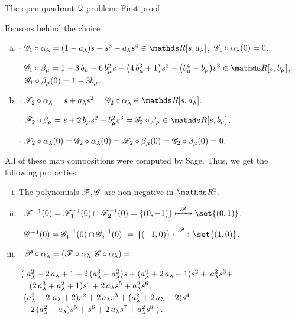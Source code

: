 \documentclass[11pt, a4paper, english, twoside, notitlepage, openright]{report}
\begin{document}
\begin{chapter}{The open quadrant $\mathcal{Q}$ problem: First proof}
\begin{section}{Reasons behind the choice}
\begin{enumerate}[(a)]
\item $\cdot$ $ \G_1\circ\alpha_{\lambda } = {\left(1-a_{\lambda} \right)}s-s^{3}-a_{\lambda} s^{4} \in\R[s,a_{\lambda}]$,
$\, \mathscr{G}_1\circ\alpha_{\lambda }(0)=0$.

$\cdot$ $\G_1\circ\beta_{\mu}=1-3\, b_{\mu}-6\,b_{\mu}^{2}s-{\left(4\,b_{\mu}^{3}+1\right)}s^{2}-{\left(b_{\mu}^{4}+ b_{\mu}\right)}s^{3}\in\R[s,b_{\mu}]$,  $\ \ \G_1\circ\beta_{\mu}(0)=1-3b_{\mu}$.
		
\item $\cdot$ $\F_2\circ\alpha_{\lambda }= s+a_{\lambda} s^{2} = \G_2\circ\alpha_{\lambda}\in\R[s,a_{\lambda }]$.
			
$\cdot$ $\F_2\circ\beta_{\mu}= s+2 \, b_{\mu} s^{2}+b_{\mu}^{2} s^{3} = \G_2\circ\beta_{\mu}\in\R[s,b_{\mu}]$.
				
$\cdot$ $\mathscr{F}_2\circ\alpha_{\lambda }(0)=\mathscr{G}_2\circ\alpha_{\lambda}(0)=\mathscr{F}_2\circ\beta_{\mu}(0)=\mathscr{G}_2\circ\beta_{\mu}(0)=0$.
\end{enumerate}
All of these map compositions were computed by Sage. Thus, we get the following properties:
		
\begin{enumerate}[(i)]
		
\item The polynomials $\mathscr{F},\mathscr{G}$ are non-negative in $\R^2$.
		
\item $\cdot$ $\F^{-1}(0)=\F_1^{-1}(0)\cap \F_2^{-1}(0)=\{(0,-1)\}\xmapsto{\ \P\ }\set{(0,1)}$.
			
$\cdot$ $\G^{-1}(0)=\G_1^{-1}(0)\cap \G_2^{-1}(0)\ =\, \{(-1,0)\} \xmapsto{\ \P\ } \set{(1,0)}$.
		
\item $\cdot$ $\mathscr{P}\circ\alpha_{\lambda}=(\mathscr{F}\circ\alpha_{\lambda },\mathscr{G}\circ\alpha_{\lambda})=$
			
$\arraycolsep=2pt\def\arraystretch{1.2}
\begin{array}{l}
\left(\right.a_{\lambda}^{2}-2 \,a_{\lambda}+1+2 \,{(a_{\lambda}^{3}-a_{\lambda}^{2})}s+{(a_{\lambda}^{4}+2 \, a_{\lambda}-1)} s^{2}+ \,a_{\lambda}^{2} s^{3}+\\
\quad {(2\, a_{\lambda}^{3}+a_{\lambda}^{2}+1)}s^{4}+2 \,a_{\lambda} s^{5}+a_{\lambda}^{2} s^{6},\\		
\ {(a_{\lambda}^{2}-2 \ a_{\lambda}+2)} s^{2}+2 \, a_{\lambda} s^{3}+{(a_{\lambda}^{2}+2 \,a_{\lambda}-2)}s^{4}+\\
\quad \,2 \,{(a_{\lambda}^{2}-a_{\lambda})}s^{5}+s^{6}+2\,a_{\lambda} s^{7}+a_{\lambda}^{2}s^{8}\left.\right).
\end{array}
$
				

\end{enumerate}
\end{section}
\end{chapter}
\end{document}
